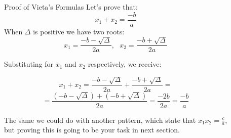 \documentclass[final]{beamer}
\newlength{\sepwid}
\newlength{\onecolwid}
\newlength{\twocolwid}
\begin{document}
\begin{frame}[t]
\begin{columns}[t]
\begin{column}{\twocolwid}
\begin{columns}[t,totalwidth=\twocolwid]
\begin{column}{\onecolwid}
  \end{column} %
  
  \begin{column}{\onecolwid} %
  
    
    \begin{block}{ Proof of Vieta's Formulas}
      Let's prove that:
        $$x_1 + x_2 = \frac{-b}{a}$$
          When $\Delta$ is positive we have two roots:
          $$x_1 = \frac{-b-\sqrt{\Delta}}{2a},\ \ \ x_2 = \frac{-b+\sqrt{\Delta}}{2a}$$
            
            Substituting for $x_1$ and $x_2$ respectively, we receive:
            
            $$x_1 + x_2 = \frac{-b-\sqrt{\Delta}}{2a} + \frac{-b+\sqrt{\Delta}}{2a} =$$
              $$ = \frac{(-b-\sqrt{\Delta}) + (-b+\sqrt{\Delta})}{2a} = \frac{-2b}{2a} = \frac{-b}{a}$$
                
                The same we could do with another pattern, which state that $x_1 x_2 = \frac{c}{a}$, but proving this is going to be your task in next section.
                
                \end{block}
                
                  
                  \end{column} %
                
                \end{columns} %
                
                \end{column} %
                
                \begin{column}{\sepwid}\end{column} %
                
                \begin{column}{\onecolwid} %
                
                  

\end{column}
\end{columns}
\end{frame}
\end{document}
